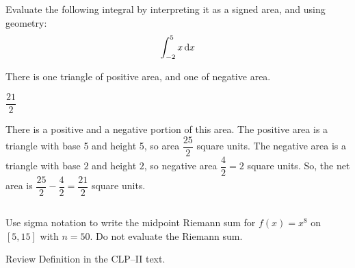 \begin{Mquestion}
Evaluate the following integral by interpreting it as a signed area, and using geometry:
\[\int_{-2}^5 x \,\mathrm{d}x\]
\end{Mquestion}
\begin{hint} There is one triangle of positive area, and one of negative area.
\end{hint}
\begin{answer}
$\dfrac{21}{2}$
\end{answer}
\begin{solution}

There is a positive and a negative portion of this area. The positive area is a triangle with base 5 and height 5, so area $\dfrac{25}{2}$ square units. The negative area is a triangle with base $2$ and height $2$, so negative area $\dfrac{4}{2}=2$ square units. So, the net area is $\dfrac{25}{2}-\dfrac{4}{2}=\dfrac{21}{2}$ square units.
\begin{center}
\end{center}
\end{solution}




\subsection*{\Procedural}

\begin{question}[M105 2014A]
Use sigma notation to write the midpoint Riemann sum for $f(x)=x^8$ on $[5,15]$
with $n=50$. Do not evaluate the Riemann sum.
\end{question}

\begin{hint}
Review Definition   in the
CLP--II text.
\end{hint}

